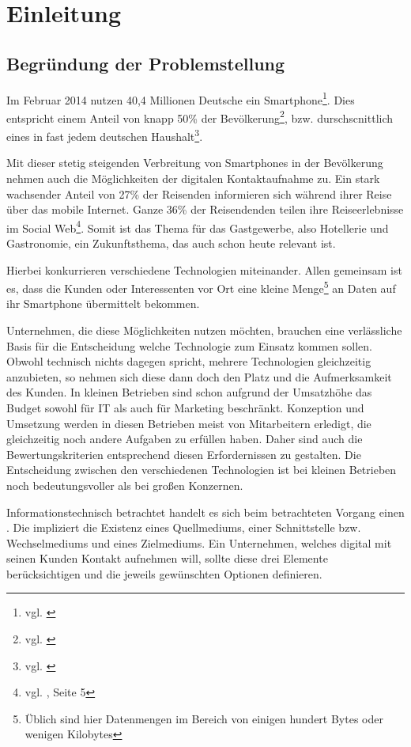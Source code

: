 \section{Einleitung}
\label{sec:einleitung}

\subsection{Begründung der Problemstellung} %

Im Februar 2014 nutzen 40,4 Millionen Deutsche ein Smartphone\footnote{vgl. \cite{netzoekonom}}. Dies entspricht einem Anteil von knapp 50\% der Bevölkerung\footnote{vgl. \cite{destatis:bev}}, bzw. durschscnittlich eines in fast jedem deutschen Haushalt\footnote{vgl. \cite{destatis:hh}}. 

Mit dieser stetig steigenden Verbreitung von Smartphones in der Bevölkerung nehmen auch die Möglichkeiten der digitalen Kontaktaufnahme zu. 
Ein stark wachsender Anteil von 27\% der Reisenden informieren sich während ihrer Reise über das mobile Internet. Ganze 36\% der Reisendenden  teilen ihre Reiseerlebnisse im Social Web\footnote{vgl. \cite{reiseanalyse}, Seite 5}. Somit ist das Thema für das Gastgewerbe, also Hotellerie und Gastronomie, ein Zukunftsthema, das auch schon heute relevant ist.

Hierbei konkurrieren verschiedene Technologien miteinander. Allen gemeinsam ist es, dass die Kunden oder Interessenten vor Ort eine kleine Menge\footnote{Üblich sind hier Datenmengen im Bereich von einigen hundert Bytes oder wenigen Kilobytes} an Daten auf ihr Smartphone übermittelt bekommen.

Unternehmen, die diese Möglichkeiten nutzen möchten, brauchen eine verlässliche Basis für die Entscheidung welche Technologie zum Einsatz kommen sollen. Obwohl technisch nichts dagegen spricht, mehrere Technologien gleichzeitig anzubieten, so nehmen sich diese dann doch den Platz und die Aufmerksamkeit des Kunden. In kleinen Betrieben sind schon aufgrund der Umsatzhöhe das Budget sowohl für \ac{IT} als auch für Marketing beschränkt. Konzeption und Umsetzung werden in diesen Betrieben meist von Mitarbeitern erledigt, die gleichzeitig noch andere Aufgaben zu erfüllen haben. Daher sind auch die Bewertungskriterien entsprechend diesen Erfordernissen zu gestalten. Die Entscheidung zwischen den verschiedenen Technologien ist bei kleinen Betrieben noch bedeutungsvoller als bei großen Konzernen.

Informationstechnisch betrachtet handelt es sich beim betrachteten Vorgang einen . Die impliziert die Existenz eines Quellmediums, einer Schnittstelle bzw. Wechselmediums und eines Zielmediums. Ein Unternehmen, welches digital mit seinen Kunden Kontakt aufnehmen will, sollte diese drei Elemente berücksichtigen und die jeweils gewünschten Optionen definieren.


